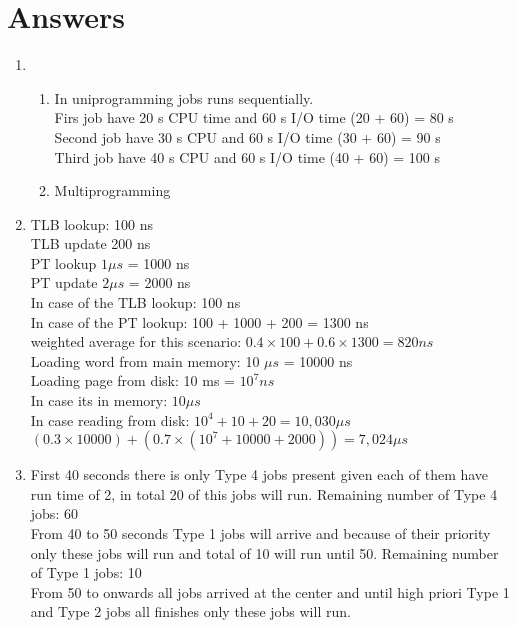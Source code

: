 \documentclass[12pt]{article}
\begin{document}
    \section*{Answers}
    \begin{enumerate}
        \item
        \begin{enumerate}
            \item In uniprogramming jobs runs sequentially.\\
            Firs job have 20 s CPU time and 60 s I/O time  (20 + 60) = 80 s\\
            Second job have 30 s CPU and 60 s I/O time (30 + 60) = 90 s\\
            Third job have 40 s CPU and 60 s I/O time (40 + 60) = 100 s\\
            \item Multiprogramming  
            
        \end{enumerate}


        \item 
        TLB lookup: 100 ns\\
        TLB update 200 ns\\
        PT lookup $1 \mu s$ = 1000 ns\\
        PT update $2 \mu s$ = 2000 ns\\

        In case of the TLB lookup: 100 ns\\
        In case of the PT lookup: 100 + 1000 + 200 = 1300 ns\\
        weighted average for this scenario: $0.4 \times 100 + 0.6 \times 1300 = 820 ns$\\

        Loading word from main memory: 10 $\mu s$ = 10000 ns\\
        Loading page from disk: 10 ms = $10^{7} ns$\\

        In case its in memory: $10 \mu s$\\
        In case reading from disk: $10^{4} + 10 + 20 = 10,030   \mu s$\\ 
        $(0.3 \times 10000) + (0.7 \times (10^{7} + 10000 + 2000)) = 7,024 \mu s$

        \item First 40 seconds there is only Type 4 jobs present given each of them have run time of 2, in total 20 of this jobs will run. Remaining number of Type 4 jobs: 60\\
        From 40 to 50 seconds Type 1 jobs will arrive and because of their priority only these jobs will run and total of 10 will run until 50. Remaining number of Type 1 jobs: 10\\
        From 50 to onwards all jobs arrived at the center and until high priori Type 1 and Type 2 jobs all finishes only these jobs will run. 


\end{enumerate}
\end{document}
